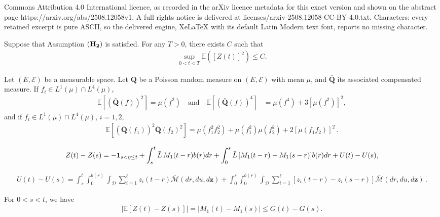 \documentclass[10pt,a4paper]{amsart}
\def\D {\mathcal{D}}
\def\E{{\mathbb E}}
\def\L {\bar{L}}
\def\z {\mathbf{z}}
\begin{document}
Commons Attribution 4.0 International licence, as recorded in the arXiv licence metadata for this exact version and shown on the abstract page https://arxiv.org/abs/2508.12058v1. A full rights notice is delivered at licenses/arxiv-2508.12058-CC-BY-4.0.txt. Characters: every retained excerpt is pure ASCII, so the delivered engine, XeLaTeX with its default Latin Modern text font, reports no missing character.
 \begin{proposition}\label{M3tC}
Suppose that Assumption ${(\bf H_2)}$ is satisfied. For any $T>0$, there exists $C$ such that 
 \begin{align*}
\sup_{0<t<T} \E([Z(t)]^2)\le C.
\end{align*} 
  \end{proposition} 

\begin{proposition}\label{MomComp}
Let $(E, \mathcal{E})$ be a measurable space. Let $\mathbf{Q}$ be a Poisson random measure on $(E, \mathcal{E})$ with mean $\mu$, and $\bar{\mathbf{Q}}$ its associated 
compensated measure. If $f_i\in L^1(\mu) \cap L^4(\mu)$, 
\begin{align*}
\E[(\bar{\mathbf{Q}}(f))^2]=\mu(f^2) \quad \mbox{and} \quad \E[(\bar{\mathbf{Q}}(f))^4]&=\mu(f^4) + 3[\mu(f^2)]^2, 
\end{align*}
and if $f_i\in L^1(\mu) \cap L^4(\mu)$, $i=1,2$, 
 \begin{align*}
\E \left[(\bar{\mathbf{Q}}(f_1))^2\bar{\mathbf{Q}}(f_2)^2 \right]=\mu(f_1^2f_2^2)+\mu(f_1^2)\mu(f_2^2)+2[\mu(f_1f_2)]^2\,.
\end{align*}
\end{proposition}

 \begin{align}\label{ecartZ}
 Z(t)-Z(s)= -{\bf1}_{s<\eta\le t}+ \int_s^t \L\, M_1(t-r)b(r)dr+\int_0^s \L\,[M_1(t-r)-M_1(s-r)]b(r)dr + U(t)-U(s),
  \end{align}

 \begin{align}\label{ecartU}
U(t)-U(s)=\int_s^t\int_0^{b(r)}\int_\D \sum_{i=1}^\ell z_i(t-r)\bar{\mathcal{M}}(dr,du,d\z)
 +\int_0^s\int_0^{b(r)}\int_\D \sum_{i=1}^\ell [z_i(t-r)-z_i(s-r)]\bar{\mathcal{M}}(dr,du,d\z) \, .
 \end{align}

  \begin{lemma}\label{ecartEZ}
For $0< s<t$, we have
 \begin{align*}
 |\E[Z(t)-Z(s)]|= |M_1(t)-M_1(s)|\le G(t)-G(s).
 \end{align*}
 \end{lemma}
\end{document}
